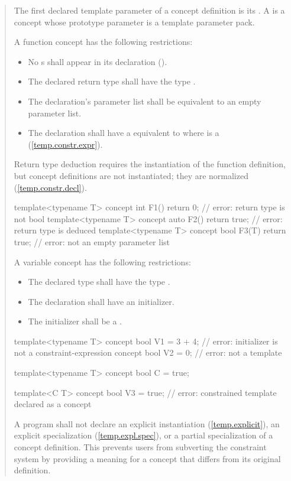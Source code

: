 \begin{quote}
\begin{addedblock}
\pnum
The first declared template parameter of a concept definition is its
. 
%
A  is a concept whose prototype parameter
is a template parameter pack.

\pnum
A function concept has the following restrictions:
\begin{itemize}
\item No s shall
     appear in its declaration ().

\item The declared return type shall have the type .

\item The declaration's parameter list shall be equivalent to an empty 
      parameter list.

\item The declaration shall have a  equivalent
to  where  is a 
 (\ref{temp.constr.expr}).
\end{itemize}
%
\enternote
Return type deduction requires the instantiation of the function 
definition, but concept definitions are not instantiated; they
are normalized (\ref{temp.constr.decl}).
\exitnote
%
\enterexample
\begin{codeblock}
template<typename T> 
  concept int F1() { return 0; }      // error: return type is not bool
template<typename T> 
  concept auto F2() { return true; }  // error: return type is deduced
template<typename T> 
  concept bool F3(T) { return true; } // error: not an empty parameter list
\end{codeblock}
\exitexample

\pnum
A variable concept has the following restrictions:
\begin{itemize}
\item The declared type shall have the type .
\item The declaration shall have an initializer.
\item The initializer shall be a .
\end{itemize}
%
\enterexample
\begin{codeblock}
template<typename T> 
  concept bool V1 = 3 + 4; // error: initializer is not a constraint-expression
concept bool V2 = 0;       // error: not a template

template<typename T> concept bool C = true;

template<C T> 
  concept bool V3 = true;  // error: constrained template declared as a concept
\end{codeblock}
\exitexample

\pnum
A program shall not declare an explicit instantiation (\ref{temp.explicit}), 
an explicit specialization (\ref{temp.expl.spec}), or a partial specialization
of a concept definition.
%
\enternote
This prevents users from subverting the constraint system by providing a 
meaning for a concept that differs from its original definition.
\exitnote
\end{addedblock}
\end{quote}
